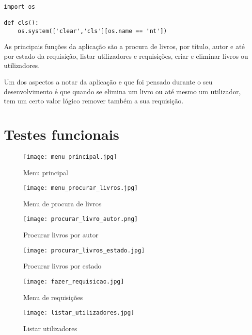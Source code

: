 \documentclass[11pt,openright,oneside]{report}
\begin{document}
\begin{verbatim}

import os

def cls():
	os.system(['clear','cls'][os.name == 'nt'])

\end{verbatim}

As principais funções da aplicação são a procura de livros, por título, autor e até por estado da requisição, listar utilizadores e requisições, criar e eliminar livros ou utilizadores.

Um dos aspectos a notar da aplicação e que foi pensado durante o seu desenvolvimento é que quando se elimina um livro ou até mesmo um utilizador, tem um certo valor lógico remover também a sua requisição.


\chapter{Testes funcionais}
\label{chap.testes}

\begin{figure}[!h]
\centering
\texttt{[image: menu\_principal.jpg]}
\caption{Menu principal}
\end{figure}

\begin{figure}[!h]
\centering
\texttt{[image: menu\_procurar\_livros.jpg]}
\caption{Menu de procura de livros}
\end{figure}

\begin{figure}[!h]
\centering
\texttt{[image: procurar\_livro\_autor.png]}
\caption{Procurar livros por autor}
\end{figure}

\begin{figure}[!h]
\centering
\texttt{[image: procurar\_livros\_estado.jpg]}
\caption{Procurar livros por estado}
\end{figure}

\begin{figure}[!h]
\centering
\texttt{[image: fazer\_requisicao.jpg]}
\caption{Menu de requisições}
\end{figure}

\begin{figure}[!h]
\centering
\texttt{[image: listar\_utilizadores.jpg]}
\caption{Listar utilizadores}
\end{figure}
\end{document}
